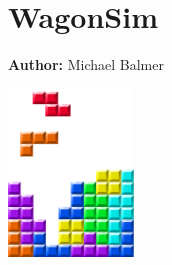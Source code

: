 \chapter{WagonSim }
\label{ch:wagonSim}

\hfill \textbf{Author:} Michael Balmer

\begin{center} \includegraphics[width=0.25\textwidth, angle=0]{figures/MATSimBook.png} \end{center}

